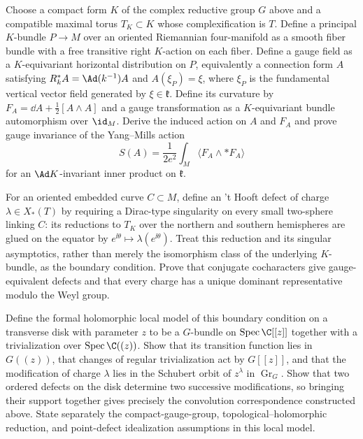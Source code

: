 \begin{exercise}
Choose a compact form $K$ of the complex reductive group $G$ above and a
compatible maximal torus $T_K\subset K$ whose complexification is $T$.  Define a
principal $K$-bundle $P\to M$ over an oriented Riemannian four-manifold as a
smooth fiber bundle with a free transitive right $K$-action on each fiber.
Define a gauge field as a $K$-equivariant horizontal distribution on $P$,
equivalently a connection form $A$ satisfying
$R_k^*A=\Ad(k^{-1})A$ and $A(\xi_P)=\xi$, where $\xi_P$ is the
fundamental vertical vector field generated by $\xi\in\mathfrak k$.  Define
its curvature by
$F_A=\dd A+\frac12[A\wedge A]$ and a gauge transformation as a
$K$-equivariant bundle automorphism over $\id_M$.  Derive the induced action
on $A$ and $F_A$ and prove gauge invariance of the Yang--Mills action
\[
 S(A)=\frac{1}{2e^2}\int_M\langle F_A\wedge *F_A\rangle
\]
for an $\Ad K$-invariant inner product on $\mathfrak k$.

For an oriented embedded curve $C\subset M$, define an 't Hooft defect of
charge $\lambda\in X_*(T)$ by requiring a Dirac-type singularity on every
small two-sphere linking $C$: its reductions to $T_K$ over the northern and
southern hemispheres are glued on the equator by
$e^{\ii\theta}\mapsto\lambda(e^{\ii\theta})$.  Treat this reduction and its
singular asymptotics, rather than merely the isomorphism class of the
underlying $K$-bundle, as the boundary condition.  Prove that conjugate
cocharacters give gauge-equivalent defects and that every charge has a unique
dominant representative modulo the Weyl group.

Define the formal holomorphic local model of this boundary condition on a
transverse disk with parameter $z$ to be a $G$-bundle on
$\operatorname{Spec}\C[[z]]$ together with a trivialization over
$\operatorname{Spec}\C((z))$.  Show that its transition function lies in
$G((z))$, that changes of regular trivialization act by $G[[z]]$, and that the
modification of charge $\lambda$ lies in the Schubert orbit of
$z^\lambda$ in $\operatorname{Gr}_G$.  Show that two ordered defects on the
disk determine two successive modifications, so bringing their support
together gives precisely the convolution correspondence constructed above.
State separately the compact-gauge-group, topological--holomorphic reduction,
and point-defect idealization assumptions in this local model.
\end{exercise}

